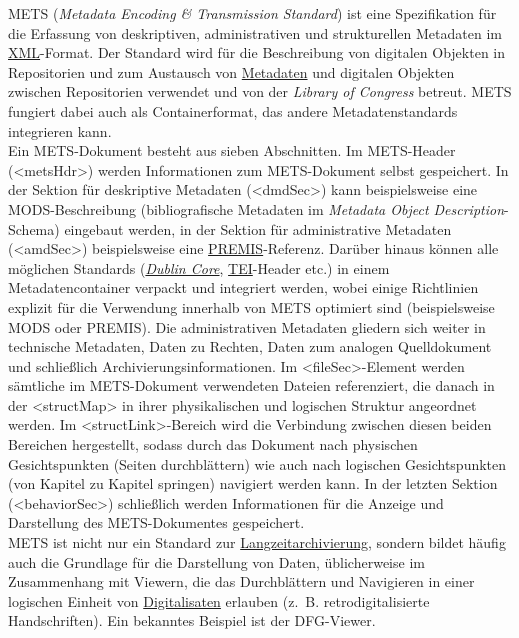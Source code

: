 \documentclass{article}
\begin{document}
    METS (\emph{Metadata Encoding \& Transmission Standard}) ist eine Spezifikation für die Erfassung von deskriptiven, administrativen und strukturellen Metadaten im \href{http://gams.uni-graz.at/o:konde.215}{XML}-Format. Der Standard wird für die Beschreibung von digitalen Objekten in Repositorien und zum Austausch von \href{http://gams.uni-graz.at/o:konde.25}{Metadaten} und digitalen Objekten zwischen Repositorien verwendet und von der\emph{ Library of Congress} betreut. METS fungiert dabei auch als Containerformat, das andere Metadatenstandards integrieren kann.\\
            
        Ein METS-Dokument besteht aus sieben Abschnitten. Im METS-Header (<metsHdr>) werden Informationen zum METS-Dokument selbst gespeichert. In der Sektion für deskriptive Metadaten (<dmdSec>) kann beispielsweise eine MODS-Beschreibung (bibliografische Metadaten im  \emph{Metadata Object Description}-Schema) eingebaut werden, in der Sektion für administrative Metadaten (<amdSec>) beispielsweise eine \href{http://gams.uni-graz.at/o:konde.130}{PREMIS}-Referenz. Darüber hinaus können alle möglichen Standards (\emph{\href{http://gams.uni-graz.at/o:konde.128}{Dublin Core}}, \href{http://gams.uni-graz.at/o:konde.178}{TEI}-Header etc.) in einem Metadatencontainer verpackt und integriert werden, wobei einige Richtlinien explizit für die Verwendung innerhalb von METS optimiert sind (beispielsweise MODS oder PREMIS). Die administrativen Metadaten gliedern sich weiter in technische Metadaten, Daten zu Rechten, Daten zum analogen Quelldokument und schließlich Archivierungsinformationen. Im <fileSec>-Element werden sämtliche im METS-Dokument verwendeten Dateien referenziert, die danach in der <structMap> in ihrer physikalischen und logischen Struktur angeordnet werden. Im <structLink>-Bereich wird die Verbindung zwischen diesen beiden Bereichen hergestellt, sodass durch das Dokument nach physischen Gesichtspunkten (Seiten durchblättern) wie auch nach logischen Gesichtspunkten (von Kapitel zu Kapitel springen) navigiert werden kann. In der letzten Sektion (<behaviorSec>) schließlich werden Informationen für die Anzeige und Darstellung des METS-Dokumentes gespeichert.\\
            
        METS ist nicht nur ein Standard zur \href{http://gams.uni-graz.at/o:konde.6}{Langzeitarchivierung}, sondern bildet häufig auch die Grundlage für die Darstellung von Daten, üblicherweise im Zusammenhang mit Viewern, die das Durchblättern und Navigieren in einer logischen Einheit von \href{http://gams.uni-graz.at/o:konde.36}{Digitalisaten} erlauben (z. B. retrodigitalisierte Handschriften). Ein bekanntes Beispiel ist der DFG-Viewer.\\
            
\end{document}
